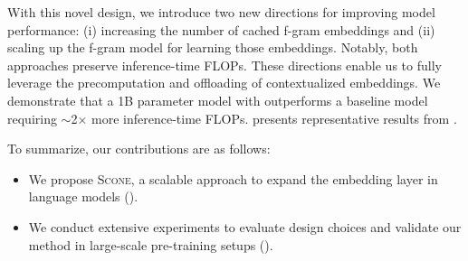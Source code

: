 With this novel design, we introduce two new directions for improving model performance: (i) increasing the number of cached f-gram embeddings and (ii) scaling up the f-gram model for learning those embeddings. Notably, both approaches preserve inference-time FLOPs. These directions enable us to fully leverage the precomputation and offloading of contextualized embeddings. We demonstrate that a 1B parameter model with \SCONE outperforms a baseline model requiring $\sim$2$\times$ more inference-time FLOPs.  presents representative results from .

To summarize, our contributions are as follows:
\begin{itemize}[nosep,topsep=-4pt]
    \item We propose \textsc{Scone}, a scalable approach to expand the embedding layer in language models ().
    \item We conduct extensive experiments to evaluate design choices and validate our method in large-scale pre-training setups (). 
\end{itemize}

